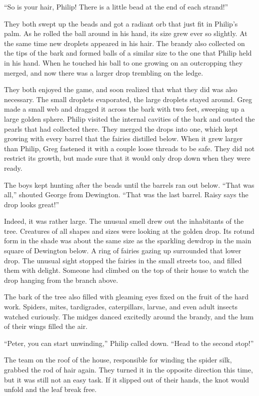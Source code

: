 \documentclass[10pt]{memoir}
\begin{document}
``So is your hair, Philip! There is a little bead at the end of each strand!''

They both swept up the beads and got a radiant orb that just fit in Philip's
palm. As he rolled the ball around in his hand, its size grew ever so slightly.
At the same time new droplets appeared in his hair. The brandy also collected
on the tips of the bark and formed balls of a similar size to the one that
Philip held in his hand. When he touched his ball to one growing on an
outcropping they merged, and now there was a larger drop trembling on the
ledge.

They both enjoyed the game, and soon realized that what they did was also
necessary. The small droplets evaporated, the large droplets stayed around.
Greg made a small web and dragged it across the bark with two feet, sweeping up
a large golden sphere. Philip visited the internal cavities of the bark and
ousted the pearls that had collected there. They merged the drops into one,
which kept growing with every barrel that the fairies distilled below. When it
grew larger than Philip, Greg fastened it with a couple loose threads to be
safe. They did not restrict its growth, but made sure that it would only drop
down when they were ready.

The boys kept hunting after the beads until the barrels ran out below. ``That
was all,'' shouted George from Dewington. ``That was the last barrel. Raisy
says the drop looks great!''

Indeed, it was rather large. The unusual smell drew out the inhabitants of the
tree. Creatures of all shapes and sizes were looking at the golden drop. Its
rotund form in the shade was about the same size as the sparkling dewdrop in
the main square of Dewington below. A ring of fairies gazing up surrounded that
lower drop. The unusual sight stopped the fairies in the small streets too, and
filled them with delight. Someone had climbed on the top of their house to
watch the drop hanging from the branch above.

The bark of the tree also filled with gleaming eyes fixed on the fruit of the
hard work. Spiders, mites, tardigrades, caterpillars, larvae, and even adult
insects watched curiously. The midges danced excitedly around the brandy, and
the hum of their wings filled the air.

``Peter, you can start unwinding,'' Philip called down. ``Head to the second
stop!''

The team on the roof of the house, responsible for winding the spider silk,
grabbed the rod of hair again. They turned it in the opposite direction this
time, but it was still not an easy task. If it slipped out of their hands, the
knot would unfold and the leaf break free.
\end{document}

